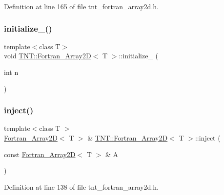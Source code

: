Definition at line 165 of file tnt\+\_\+fortran\+\_\+array2d.\+h.

\mbox{\label{classTNT_1_1Fortran__Array2D_adcee9bb7a12225f561a2f8d9ac7aabc3}} 
\subsubsection{\texorpdfstring{initialize\+\_\+()}{initialize\_()}}
{\footnotesize\ttfamily template$<$class T$>$ \\
void \hyperlink{classTNT_1_1Fortran__Array2D}{T\+N\+T\+::\+Fortran\+\_\+\+Array2D}$<$ T $>$\+::initialize\+\_\+ (\begin{DoxyParamCaption}\item[{int}]{n }\end{DoxyParamCaption})\hspace{0.3cm}{\ttfamily [private]}}

\mbox{\label{classTNT_1_1Fortran__Array2D_a893c3e37cf3f590705340c476bb75f3c}} 
\subsubsection{\texorpdfstring{inject()}{inject()}}
{\footnotesize\ttfamily template$<$class T $>$ \\
\hyperlink{classTNT_1_1Fortran__Array2D}{Fortran\+\_\+\+Array2D}$<$ T $>$ \& \hyperlink{classTNT_1_1Fortran__Array2D}{T\+N\+T\+::\+Fortran\+\_\+\+Array2D}$<$ T $>$\+::inject (\begin{DoxyParamCaption}\item[{const \hyperlink{classTNT_1_1Fortran__Array2D}{Fortran\+\_\+\+Array2D}$<$ T $>$ \&}]{A }\end{DoxyParamCaption})}



Definition at line 138 of file tnt\+\_\+fortran\+\_\+array2d.\+h.

\mbox{\label{classTNT_1_1Fortran__Array2D_ad285fd42092b4815d69c2aad73a5bb30}} 
